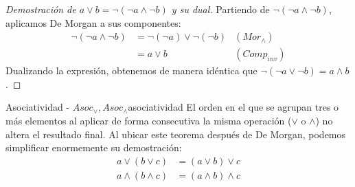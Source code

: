 \documentclass[12pt,a4paper]{article}
\begin{document}
{\begin{proof}[Demostración de $a \vee b = \neg (\neg a \wedge \neg b)$ y su dual]
Partiendo de $\neg (\neg a \wedge \neg b)$, aplicamos De Morgan a sus componentes:
\begin{align*}
    \neg (\neg a \wedge \neg b) &= \neg (\neg a) \vee \neg (\neg b) & (Mor_\wedge) \\
    &= a \vee b & (Comp_{inv})
\end{align*}
Dualizando la expresión, obtenemos de manera idéntica que $\neg (\neg a \vee \neg b) = a \wedge b$.
\end{proof}
}

\begin{teorema}{Asociatividad - $Asoc_\vee, Asoc_\wedge$}{asociatividad}
El orden en el que se agrupan tres o más elementos al aplicar de forma consecutiva la misma operación ($\vee$ o $\wedge$) no altera el resultado final. Al ubicar este teorema después de De Morgan, podemos simplificar enormemente su demostración:
\begin{align*}
    a \vee (b \vee c) &= (a \vee b) \vee c \\
    a \wedge (b \wedge c) &= (a \wedge b) \wedge c
\end{align*}
\end{teorema}
\end{document}
